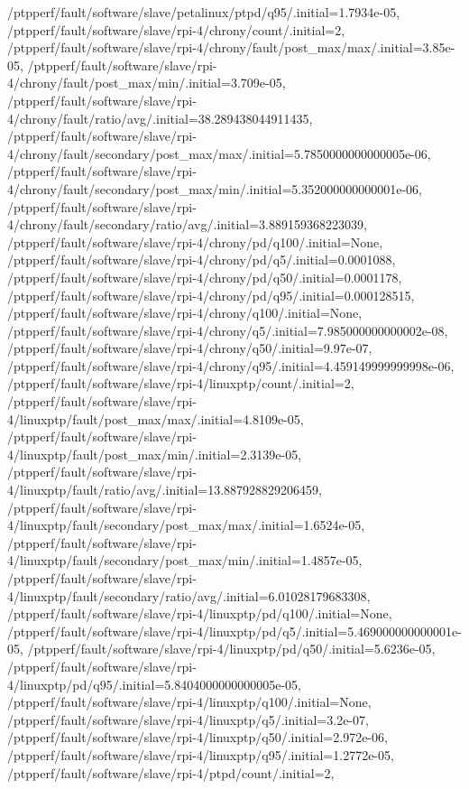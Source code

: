 {    /ptpperf/fault/software/slave/petalinux/ptpd/q95/.initial=1.7934e-05,
    /ptpperf/fault/software/slave/rpi-4/chrony/count/.initial=2,
    /ptpperf/fault/software/slave/rpi-4/chrony/fault/post_max/max/.initial=3.85e-05,
    /ptpperf/fault/software/slave/rpi-4/chrony/fault/post_max/min/.initial=3.709e-05,
    /ptpperf/fault/software/slave/rpi-4/chrony/fault/ratio/avg/.initial=38.289438044911435,
    /ptpperf/fault/software/slave/rpi-4/chrony/fault/secondary/post_max/max/.initial=5.7850000000000005e-06,
    /ptpperf/fault/software/slave/rpi-4/chrony/fault/secondary/post_max/min/.initial=5.352000000000001e-06,
    /ptpperf/fault/software/slave/rpi-4/chrony/fault/secondary/ratio/avg/.initial=3.889159368223039,
    /ptpperf/fault/software/slave/rpi-4/chrony/pd/q100/.initial=None,
    /ptpperf/fault/software/slave/rpi-4/chrony/pd/q5/.initial=0.0001088,
    /ptpperf/fault/software/slave/rpi-4/chrony/pd/q50/.initial=0.0001178,
    /ptpperf/fault/software/slave/rpi-4/chrony/pd/q95/.initial=0.000128515,
    /ptpperf/fault/software/slave/rpi-4/chrony/q100/.initial=None,
    /ptpperf/fault/software/slave/rpi-4/chrony/q5/.initial=7.985000000000002e-08,
    /ptpperf/fault/software/slave/rpi-4/chrony/q50/.initial=9.97e-07,
    /ptpperf/fault/software/slave/rpi-4/chrony/q95/.initial=4.459149999999998e-06,
    /ptpperf/fault/software/slave/rpi-4/linuxptp/count/.initial=2,
    /ptpperf/fault/software/slave/rpi-4/linuxptp/fault/post_max/max/.initial=4.8109e-05,
    /ptpperf/fault/software/slave/rpi-4/linuxptp/fault/post_max/min/.initial=2.3139e-05,
    /ptpperf/fault/software/slave/rpi-4/linuxptp/fault/ratio/avg/.initial=13.887928829206459,
    /ptpperf/fault/software/slave/rpi-4/linuxptp/fault/secondary/post_max/max/.initial=1.6524e-05,
    /ptpperf/fault/software/slave/rpi-4/linuxptp/fault/secondary/post_max/min/.initial=1.4857e-05,
    /ptpperf/fault/software/slave/rpi-4/linuxptp/fault/secondary/ratio/avg/.initial=6.01028179683308,
    /ptpperf/fault/software/slave/rpi-4/linuxptp/pd/q100/.initial=None,
    /ptpperf/fault/software/slave/rpi-4/linuxptp/pd/q5/.initial=5.469000000000001e-05,
    /ptpperf/fault/software/slave/rpi-4/linuxptp/pd/q50/.initial=5.6236e-05,
    /ptpperf/fault/software/slave/rpi-4/linuxptp/pd/q95/.initial=5.8404000000000005e-05,
    /ptpperf/fault/software/slave/rpi-4/linuxptp/q100/.initial=None,
    /ptpperf/fault/software/slave/rpi-4/linuxptp/q5/.initial=3.2e-07,
    /ptpperf/fault/software/slave/rpi-4/linuxptp/q50/.initial=2.972e-06,
    /ptpperf/fault/software/slave/rpi-4/linuxptp/q95/.initial=1.2772e-05,
    /ptpperf/fault/software/slave/rpi-4/ptpd/count/.initial=2,
}
